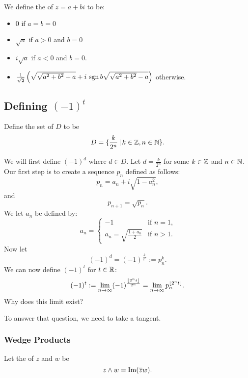 \begin{definition}
    We define the  of $z = a+bi$ to be:
    \begin{itemize}
        \item $0$ if $a=b=0$
        \item $\sqrt{a}$ if $a>0$ and $b = 0$
        \item $i\sqrt{a}$ if $a < 0$ and $b = 0$.
        \item $\frac{1}{\sqrt{2}}\left( \sqrt{ \sqrt{a^2 + b^2} + a} 
            + i\, \operatorname{sgn}{b} \sqrt{\sqrt{a^2+b^2}-a} \right)$ otherwise. 
    \end{itemize}
\end{definition}


\subsection{Defining \texorpdfstring{${(-1)}^t$}{-1 to a power}}

\begin{definition}
    Define the set of  $D$ to be
    \[ D = \{ \frac{k}{2^n} \, | \, k \in \operatorname{\mathbb{Z}}, n \in \operatorname{\mathbb{N}} \}. \]
\end{definition}

We will first define ${(-1)}^d$ where $d \in D$.
Let $d = \frac{k}{2^n}$ for some $k \in \operatorname{\mathbb{Z}}$ and $n \in \operatorname{\mathbb{N}}$.
Our first step is to create a sequence $p_n$ defined as follows:
\[ p_n = a_n + i \sqrt{1 - a_n^2}, \]
and 
\[ p_{n+1} = \sqrt{p_n}. \]
We let $a_n$ be defined by:
\[ a_n = \begin{cases}
        -1 & \text{if $n = 1$,} \\
        a_n = \sqrt{\frac{1 + a_n}{2}} & \text{if $n > 1$.}
    \end{cases}
\]
Now let
\[ (-1)^d = (-1)^{\frac{k}{2^n}} := p_n^k. \]
We can now define $(-1)^t$ for $t \in \operatorname{\mathbb{R}}$:
\[ (-1)^t := \lim_{n \to \infty} (-1)^{\frac{\left \lfloor{2^nt}\right \rfloor}{2^n}}
    = \lim_{n \to \infty} p_n^{\left \lfloor{2^nt}\right \rfloor}.
\]
Why does this limit exist?

\noindent
To answer that question, we need to take a tangent.

\subsubsection{Wedge Products}

\begin{definition}
    Let the  of $z$ and $w$ be
    \[ z \wedge w = \operatorname{Im} (\overline{z}w). \]
\end{definition}

